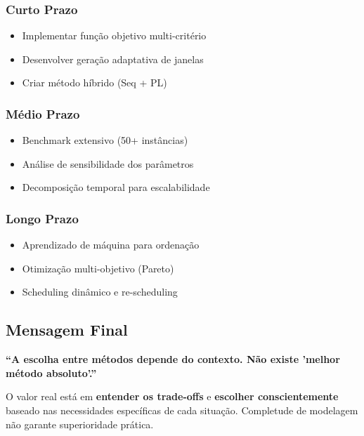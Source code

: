 \documentclass[12pt,a4paper]{article}
\theoremstyle{definition}
\begin{document}
\subsubsection{Curto Prazo}
\begin{itemize}
    \item Implementar função objetivo multi-critério
    \item Desenvolver geração adaptativa de janelas
    \item Criar método híbrido (Seq + PL)
\end{itemize}

\subsubsection{Médio Prazo}
\begin{itemize}
    \item Benchmark extensivo (50+ instâncias)
    \item Análise de sensibilidade dos parâmetros
    \item Decomposição temporal para escalabilidade
\end{itemize}

\subsubsection{Longo Prazo}
\begin{itemize}
    \item Aprendizado de máquina para ordenação
    \item Otimização multi-objetivo (Pareto)
    \item Scheduling dinâmico e re-scheduling
\end{itemize}

\subsection{Mensagem Final}

\begin{tcolorbox}[colback=blue!5!white,colframe=blue!75!black,title=Conclusão Principal]
\textbf{``A escolha entre métodos depende do contexto. Não existe 'melhor método absoluto'.''}

O valor real está em \textbf{entender os trade-offs} e \textbf{escolher conscientemente} baseado nas necessidades específicas de cada situação. Completude de modelagem não garante superioridade prática.
\end{tcolorbox}
\end{document}
